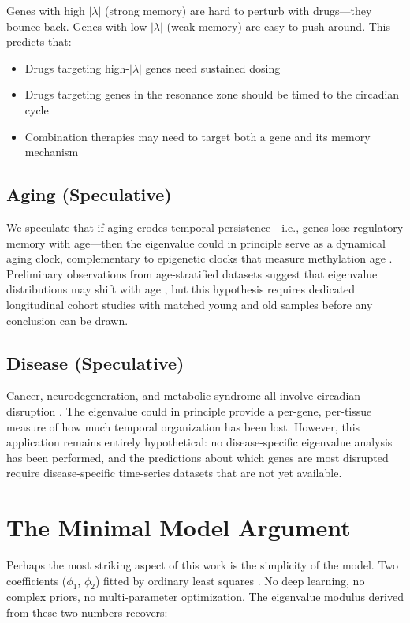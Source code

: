 \documentclass[11pt,letterpaper]{article}
\begin{document}
Genes with high $|\lambda|$ (strong memory) are hard to perturb with drugs---they bounce back. Genes with low $|\lambda|$ (weak memory) are easy to push around. This predicts that:
\begin{itemize}
\item Drugs targeting high-$|\lambda|$ genes need sustained dosing
\item Drugs targeting genes in the resonance zone should be timed to the circadian cycle \citep{dallmann2016chronopharmacology, matsuo2003control}
\item Combination therapies may need to target both a gene and its memory mechanism
\end{itemize}

\subsection{Aging (Speculative)}

We speculate that if aging erodes temporal persistence---i.e., genes lose regulatory memory with age---then the eigenvalue could in principle serve as a dynamical aging clock, complementary to epigenetic clocks that measure methylation age \citep{horvath2013dna}. Preliminary observations from age-stratified datasets suggest that eigenvalue distributions may shift with age \citep{whiteside2026par2a}, but this hypothesis requires dedicated longitudinal cohort studies with matched young and old samples before any conclusion can be drawn.

\subsection{Disease (Speculative)}

Cancer, neurodegeneration, and metabolic syndrome all involve circadian disruption \citep{fu2003circadian, masri2015circadian}. The eigenvalue could in principle provide a per-gene, per-tissue measure of how much temporal organization has been lost. However, this application remains entirely hypothetical: no disease-specific eigenvalue analysis has been performed, and the predictions about which genes are most disrupted require disease-specific time-series datasets that are not yet available.

\section{The Minimal Model Argument}

Perhaps the most striking aspect of this work is the simplicity of the model. Two coefficients ($\phi_1$, $\phi_2$) fitted by ordinary least squares \citep{hamilton1994time}. No deep learning, no complex priors, no multi-parameter optimization. The eigenvalue modulus derived from these two numbers recovers:
\end{document}
